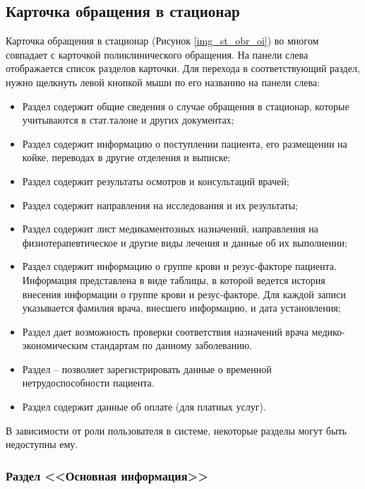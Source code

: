 \subsection{Карточка обращения в стационар} 

Карточка обращения в стационар (Рисунок \ref{img_st_obr_oi}) во многом совпадает с карточкой поликлинического обращения. На панели слева отображается список разделов карточки. Для перехода в соответствующий раздел, нужно щелкнуть левой кнопкой мыши по его названию на панели слева:
\begin{itemize}
 \item Раздел  содержит общие сведения о случае обращения в стационар, которые учитываются в стат.талоне и других документах;
 \item Раздел  содержит информацию о поступлении пациента, его размещении на койке, переводах в другие отделения  и выписке;
 \item Раздел  содержит результаты осмотров и консультаций врачей;
 \item Раздел  содержит направления на исследования и их результаты;
 \item Раздел  содержит лист медикаментозных назначений, направления на физиотерапевтическое и другие виды лечения и данные об их выполнении;
 \item Раздел  содержит информацию о группе крови и резус-факторе пациента. Информация представлена в виде таблицы, в которой ведется история внесения информации о группе крови и резус-факторе. Для каждой записи указывается фамилия врача, внесшего информацию, и дата установления;
 \item Раздел  дает возможность проверки соответствия назначений врача медико-экономическим стандартам по данному заболеванию.
 \item Раздел  – позволяет зарегистрировать данные о временной нетрудоспособности пациента. 
 \item Раздел  содержит данные об оплате (для платных услуг).
\end{itemize}
 
В зависимости от роли пользователя в системе, некоторые разделы могут быть недоступны ему.

\subsubsection{Раздел <<Основная информация>>}

